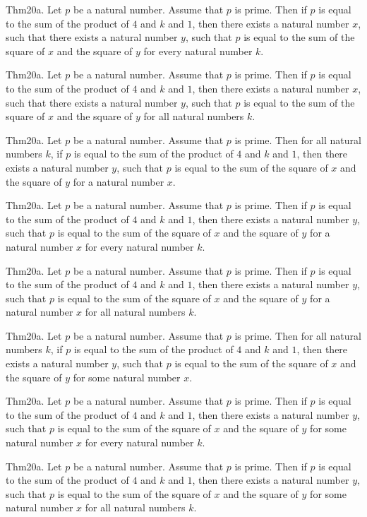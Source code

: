 \documentclass{article}
\begin{document}
Thm20a. Let $p$ be a natural number. Assume that $p$ is prime. Then if $p$ is equal to the sum of the product of $4$ and $k$ and $1$, then there exists a natural number $x$, such that there exists a natural number $y$, such that $p$ is equal to the sum of the square of $x$ and the square of $y$ for every natural number $k$.

Thm20a. Let $p$ be a natural number. Assume that $p$ is prime. Then if $p$ is equal to the sum of the product of $4$ and $k$ and $1$, then there exists a natural number $x$, such that there exists a natural number $y$, such that $p$ is equal to the sum of the square of $x$ and the square of $y$ for all natural numbers $k$.

Thm20a. Let $p$ be a natural number. Assume that $p$ is prime. Then for all natural numbers $k$, if $p$ is equal to the sum of the product of $4$ and $k$ and $1$, then there exists a natural number $y$, such that $p$ is equal to the sum of the square of $x$ and the square of $y$ for a natural number $x$.

Thm20a. Let $p$ be a natural number. Assume that $p$ is prime. Then if $p$ is equal to the sum of the product of $4$ and $k$ and $1$, then there exists a natural number $y$, such that $p$ is equal to the sum of the square of $x$ and the square of $y$ for a natural number $x$ for every natural number $k$.

Thm20a. Let $p$ be a natural number. Assume that $p$ is prime. Then if $p$ is equal to the sum of the product of $4$ and $k$ and $1$, then there exists a natural number $y$, such that $p$ is equal to the sum of the square of $x$ and the square of $y$ for a natural number $x$ for all natural numbers $k$.

Thm20a. Let $p$ be a natural number. Assume that $p$ is prime. Then for all natural numbers $k$, if $p$ is equal to the sum of the product of $4$ and $k$ and $1$, then there exists a natural number $y$, such that $p$ is equal to the sum of the square of $x$ and the square of $y$ for some natural number $x$.

Thm20a. Let $p$ be a natural number. Assume that $p$ is prime. Then if $p$ is equal to the sum of the product of $4$ and $k$ and $1$, then there exists a natural number $y$, such that $p$ is equal to the sum of the square of $x$ and the square of $y$ for some natural number $x$ for every natural number $k$.

Thm20a. Let $p$ be a natural number. Assume that $p$ is prime. Then if $p$ is equal to the sum of the product of $4$ and $k$ and $1$, then there exists a natural number $y$, such that $p$ is equal to the sum of the square of $x$ and the square of $y$ for some natural number $x$ for all natural numbers $k$.
\end{document}
